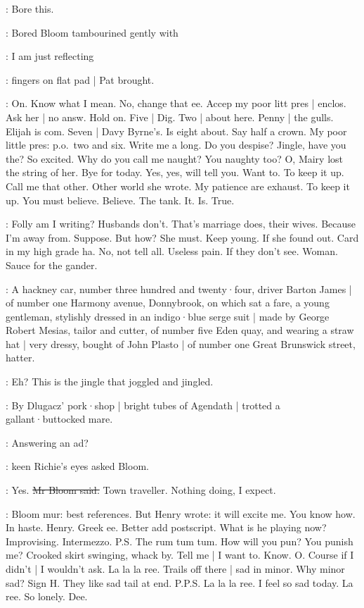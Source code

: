 \BloomInt:
Bore this.

:
Bored Bloom tambourined gently with

\BloomInt:
I am just reflecting

:
fingers on flat pad |
Pat brought.

\BloomInt:
On.
Know what I mean.
No,
change that ee.
Accep my poor litt pres |
enclos.
Ask her |
no answ.
Hold on.
Five |
Dig.
Two |
about here.
Penny |
the gulls.
Elijah is com.
Seven |
Davy Byrne's.
Is eight about.
Say half a crown.
My poor little pres:
p.o.\
two and six.
Write me a long.
Do you despise?
Jingle,
have you the?
So excited.
Why do you call me naught?
You naughty too?
O,
Mairy lost the string of her.
Bye for today.
Yes,
yes,
will tell you.
Want to.
To keep it up.
Call me that other.
Other world she wrote.
My patience are exhaust.
To keep it up.
You must believe.
Believe.
The tank.
It.
Is.
True.

\BloomInt:
Folly am I writing?
Husbands don't.
That's marriage does,
their wives.
Because I'm away from.
Suppose.
But how?
She must.
Keep young.
If she found out.
Card in my high grade ha.
No,
not tell all.
Useless pain.
If they don't see.
Woman.
Sauce for the gander.

:
A hackney car,
number three hundred and twenty·four,
driver Barton James |
of number one Harmony avenue,
Donnybrook,
on which sat a fare,
a young gentleman,
stylishly dressed in an indigo·blue serge suit |
made by George Robert Mesias,
tailor and cutter,
of number five Eden quay,
and wearing a straw hat |
very dressy,
bought of John Plasto |
of number one Great Brunswick street,
hatter.

\BloomInt:
Eh?
This is the jingle that joggled and jingled.

:
By Dlugacz' pork·shop |
bright tubes of Agendath |
trotted a gallant·buttocked mare.

\goulding:
Answering an ad?

:
keen Richie's eyes asked Bloom.

\Bloom:
Yes.
\sout{Mr Bloom said.}
Town traveller.
Nothing doing,
I expect.

\BloomInt:
Bloom mur:
best references.
But Henry wrote:
it will excite me.
You know how.
In haste.
Henry.
Greek ee.
Better add postscript.
What is he playing now?
Improvising.
Intermezzo.
P.S\@.
The rum tum tum.
How will you pun?
You punish me?
Crooked skirt swinging,
whack by.
Tell me |
I want to.
Know.
O\@.
Course if I didn't |
I wouldn't ask.
La la la ree.
Trails off there |
sad in minor.
Why minor sad?
Sign H\@.
They like sad tail at end.
P.P.S\@.
La la la ree.
I feel so sad today.
La ree.
So lonely.
Dee.

